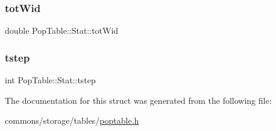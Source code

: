 \mbox{\label{struct_pop_table_1_1_stat_a41ae97039ad5625859541b4d61884a15}} 
\subsubsection{\texorpdfstring{totWid}{totWid}}
{\footnotesize\ttfamily double Pop\+Table\+::\+Stat\+::tot\+Wid}

\mbox{\label{struct_pop_table_1_1_stat_a1978d9f24f84c110c7812ab972ee3bf8}} 
\subsubsection{\texorpdfstring{tstep}{tstep}}
{\footnotesize\ttfamily int Pop\+Table\+::\+Stat\+::tstep}



The documentation for this struct was generated from the following file\+:\begin{DoxyCompactItemize}
\item 
commons/storage/tables/\mbox{\hyperlink{poptable_8h}{poptable.\+h}}\end{DoxyCompactItemize}
